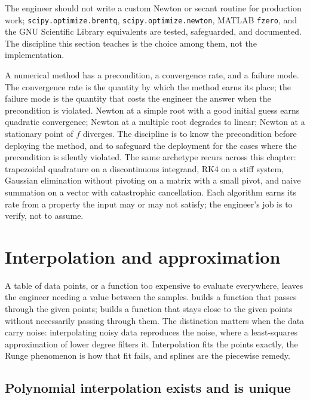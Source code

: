 The engineer should not write a custom Newton or secant routine
for production work; \texttt{scipy.optimize.brentq},
\texttt{scipy.optimize.newton}, MATLAB \texttt{fzero}, and the
GNU Scientific Library equivalents are tested, safeguarded, and
documented. The discipline this section teaches is the choice
among them, not the implementation.

\begin{archetype}
A numerical method has a precondition, a convergence rate, and a
failure mode. The convergence rate is the quantity by which the
method earns its place; the failure mode is the quantity that
costs the engineer the answer when the precondition is violated.
Newton at a simple root with a good initial guess earns quadratic
convergence; Newton at a multiple root degrades to linear; Newton
at a stationary point of $f$ diverges. The discipline is to know
the precondition before deploying the method, and to safeguard
the deployment for the cases where the precondition is silently
violated. The same archetype recurs across this chapter:
trapezoidal quadrature on a discontinuous integrand, RK4 on a
stiff system, Gaussian elimination without pivoting on a matrix
with a small pivot, and naive summation on a vector with
catastrophic cancellation. Each algorithm earns its rate from a
property the input may or may not satisfy; the engineer's job is
to verify, not to assume.
\end{archetype}

\section{Interpolation and approximation}

A table of data points, or a function too expensive to evaluate
everywhere, leaves the engineer needing a value between the samples.
 builds a function that passes through the
given points;  builds a function that stays
close to the given points without necessarily passing through them.
The distinction matters when the data carry noise: interpolating
noisy data reproduces the noise, where a least-squares
approximation of lower degree filters it. Interpolation fits the
points exactly, the Runge phenomenon is how that fit fails, and splines
are the piecewise remedy.

\subsection{Polynomial interpolation exists and is unique}

